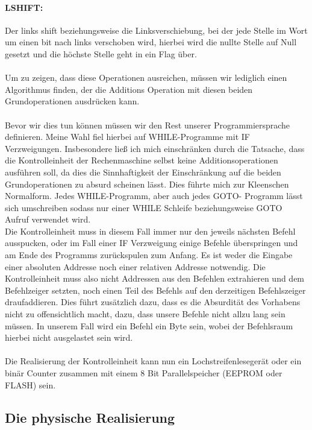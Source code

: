 \documentclass[11pt,a4paper,leqno]{report}
\numberwithin{equation}{chapter}
\begin{document}
\paragraph{LSHIFT:} Der links shift beziehungsweise die Linksverschiebung, bei der jede Stelle im Wort um einen bit nach links verschoben wird, hierbei wird die nullte Stelle auf Null gesetzt und die h\"ochste Stelle geht in ein Flag \"uber.\\
\\
Um zu zeigen, dass diese Operationen ausreichen, m\"ussen wir lediglich einen Algorithmus finden, der die Additions Operation mit diesen beiden Grundoperationen ausdr\"ucken kann.
\\
\\
Bevor wir dies tun k\"onnen m\"ussen wir den Rest unserer Programmiersprache definieren. Meine Wahl fiel hierbei auf WHILE-Programme mit IF Verzweigungen. Insbesondere lie\ss{} ich mich einschr\"anken durch die Tatsache, dass die Kontrolleinheit der Rechenmaschine selbst keine Additionsoperationen ausf\"uhren soll, da dies die Sinnhaftigkeit der Einschr\"ankung auf die beiden Grundoperationen zu absurd scheinen l\"asst. Dies f\"uhrte mich zur Kleenschen Normalform. Jedes WHILE-Programm, aber auch jedes GOTO- Programm l\"asst sich umschreiben sodass nur einer WHILE Schleife beziehungsweise GOTO Aufruf verwendet wird.\\
Die Kontrolleinheit muss in diesem Fall immer nur den jeweils n\"achsten Befehl ausspucken, oder im Fall einer IF Verzweigung einige Befehle \"uberspringen und am Ende des Programms zur\"uckspulen zum Anfang. Es ist weder die Eingabe einer absoluten Addresse noch einer relativen Addresse notwendig. Die Kontrolleinheit muss also nicht Addressen aus den Befehlen extrahieren und dem Befehlzeiger setzten, noch einen Teil des Befehls auf den derzeitigen Befehlszeiger draufaddieren. Dies f\"uhrt zus\"atzlich dazu, dass es die Absurdit\"at des Vorhabens nicht zu offensichtlich macht, dazu, dass unsere Befehle nicht allzu lang sein m\"ussen. In unserem Fall wird ein Befehl ein Byte sein, wobei der Befehlsraum hierbei nicht ausgelastet sein wird.\\
\\
Die Realisierung der Kontrolleinheit kann nun ein Lochstreifenleseger\"at oder ein bin\"ar Counter zusammen mit einem 8 Bit Parallelspeicher (EEPROM oder FLASH) sein.
\subsection{Die physische Realisierung}
\end{document}
